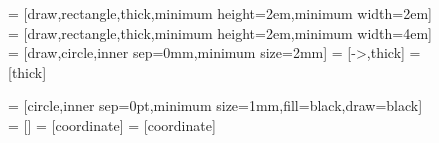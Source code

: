 \begin{figure}[ht]
\centering %
 = [draw,rectangle,thick,minimum height=2em,minimum width=2em]
 = [draw,rectangle,thick,minimum height=2em,minimum width=4em]
 = [draw,circle,inner sep=0mm,minimum size=2mm]
 = [->,thick]
 = [thick]

 = [circle,inner sep=0pt,minimum size=1mm,fill=black,draw=black]
 = []
 = [coordinate]
 = [coordinate]

\begin{tikzpicture}[scale=1, auto, >=stealth']

		

%
%

\end{tikzpicture}
\end{figure}
